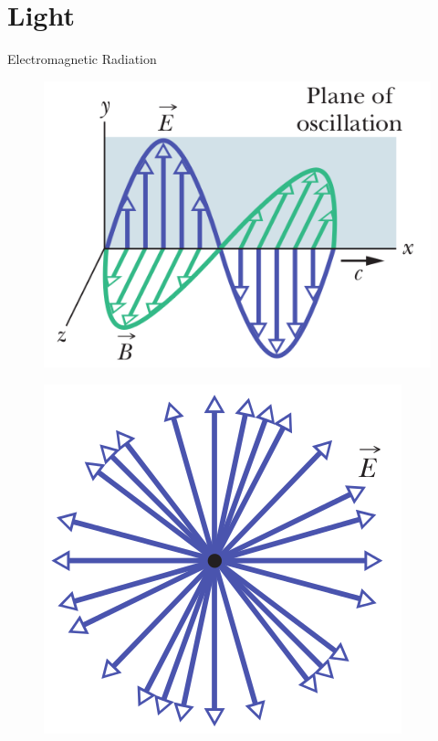 \documentclass[10pt]{beamer}
\begin{document}
	\section{Light}
	\begin{frame}{Electromagnetic Radiation}
	\begin{minipage}{0.47\textwidth}
			\begin{figure}
			\includegraphics[scale=0.3]{EM.png}
			\end{figure}
			\end{minipage}
			\begin{minipage}{0.5\textwidth}
			\begin{figure}
			\includegraphics[scale=0.3]{unpol.png}
			\end{figure}
			\end{minipage}
	\end{frame}
	
\end{document}
